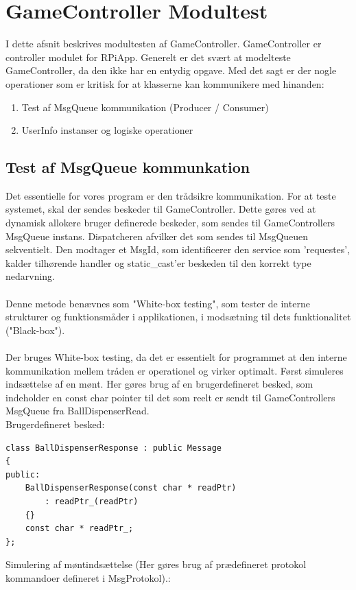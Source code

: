 \documentclass[Modultest/Modultest_main.tex]{subfiles}
\begin{document}
\section{GameController Modultest}
I dette afsnit beskrives modultesten af GameController. GameController er controller modulet for RPiApp. Generelt er det svært at modelteste GameController, da den ikke har en entydig opgave. Med det sagt er der nogle operationer som er kritisk for at klasserne kan kommunikere med hinanden: 
\begin{enumerate}
    \item Test af MsgQueue kommunikation (Producer / Consumer)
    \item UserInfo instanser og logiske operationer 
\end{enumerate}

\subsection{Test af MsgQueue kommunkation}
Det essentielle for vores program er den trådsikre kommunikation. For at teste systemet, skal der sendes beskeder til GameController. Dette gøres ved at dynamisk allokere bruger definerede beskeder, som sendes til GameControllers MsgQueue instans. Dispatcheren afvilker det som sendes til MsgQueuen sekventielt. Den modtager et MsgId, som identificerer den service som 'requestes', kalder tilhørende handler og static\_cast'er beskeden til den korrekt type nedarvning. \\\\
Denne metode benævnes som "White-box testing", som tester de interne strukturer og funktionsmåder i applikationen, i modsætning til dets funktionalitet ("Black-box").\\\\
Der bruges White-box testing, da det er essentielt for programmet at den interne kommunikation mellem tråden er operationel og virker optimalt. 
Først simuleres indsættelse af en mønt. Her gøres brug af en brugerdefineret besked, som indeholder en const char pointer til det som reelt er sendt til GameControllers MsgQueue fra BallDispenserRead. \\
Brugerdefineret besked: 
\begin{lstlisting}
class BallDispenserResponse : public Message
{
public:
	BallDispenserResponse(const char * readPtr)
	    : readPtr_(readPtr)
	{}
	const char * readPtr_;
};
\end{lstlisting}
Simulering af møntindsættelse (Her gøres brug af prædefineret protokol kommandoer defineret i MsgProtokol).: 
\end{document}
